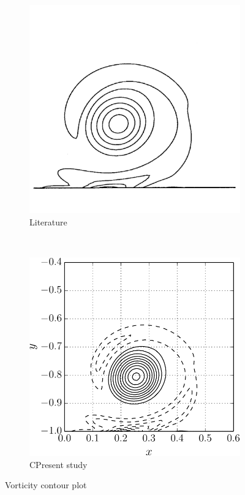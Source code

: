 	\begin{figure}[p]
     \centering
     \begin{subfigure}[t]{0.4\textwidth}
             \includegraphics[width=\textwidth]{figures/eulerian/VorticityContourPlot-rotated270.pdf}
             \caption{Literature}
             \label{fig:VorticityContourPlot}
     \end{subfigure}%
     ~ %
     \begin{subfigure}[t]{0.5\textwidth}
             \includegraphics[width=\textwidth]{figures/eulerian/dipole_contourLine_t1p0-crop.pdf}
             \caption{CPresent study}
             \label{fig:dipole_contourLine_t1p0}
     \end{subfigure}
     \caption{Vorticity contour plot}
     \label{fig:vorticity_contour_comparison}
	\end{figure}	
	
